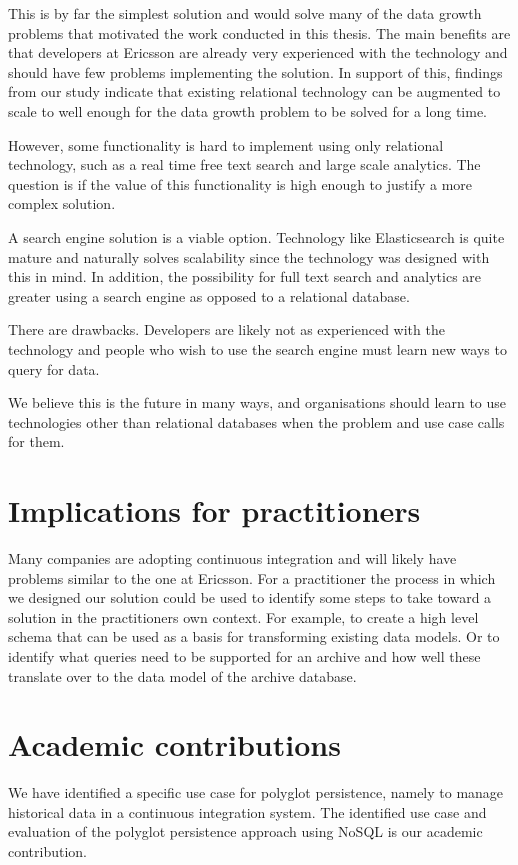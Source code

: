 This is by far the simplest solution and would solve many of the data growth problems that motivated the work conducted in this thesis. The main benefits are that developers at Ericsson are already very experienced with the technology and should have few problems implementing the solution. In support of this, findings from our study indicate that existing relational technology can be augmented to scale to well enough for the data growth problem to be solved for a long time.

However, some functionality is hard to implement using only relational technology, such as a real time free text search and large scale analytics. The question is if the value of this functionality is high enough to justify a more complex solution.

A search engine solution is a viable option. Technology like Elasticsearch is quite mature and naturally solves scalability since the technology was designed with this in mind. In addition, the possibility for full text search and analytics are greater using a search engine as opposed to a relational database.

There are drawbacks. Developers are likely not as experienced with the technology and people who wish to use the search engine must learn new ways to query for data.

We believe this is the future in many ways, and organisations should learn to use technologies other than relational databases when the problem and use case calls for them.


\section{Implications for practitioners}
Many companies are adopting continuous integration and will likely have problems similar to the one at Ericsson. For a practitioner the process in which we designed our solution could be used to identify some steps to take toward a solution in the practitioners own context. For example, to create a high level schema that can be used as a basis for transforming existing data models. Or to identify what queries need to be supported for an archive and how well these translate over to the data model of the archive database.

\section{Academic contributions}
We have identified a specific use case for polyglot persistence, namely to manage historical data in a continuous integration system. The identified use case and evaluation of the polyglot persistence approach using NoSQL is our academic contribution.

